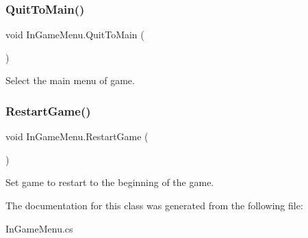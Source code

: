 \subsubsection{\texorpdfstring{Quit\+To\+Main()}{QuitToMain()}}
{\footnotesize\ttfamily void In\+Game\+Menu.\+Quit\+To\+Main (\begin{DoxyParamCaption}{ }\end{DoxyParamCaption})}



Select the main menu of game. 

\hypertarget{class_in_game_menu_a5673b1a965bea0c59e6fd43a0655e8b8}{}\label{class_in_game_menu_a5673b1a965bea0c59e6fd43a0655e8b8} 
\subsubsection{\texorpdfstring{Restart\+Game()}{RestartGame()}}
{\footnotesize\ttfamily void In\+Game\+Menu.\+Restart\+Game (\begin{DoxyParamCaption}{ }\end{DoxyParamCaption})}



Set game to restart to the beginning of the game. 



The documentation for this class was generated from the following file\+:\begin{DoxyCompactItemize}
\item 
In\+Game\+Menu.\+cs\end{DoxyCompactItemize}
